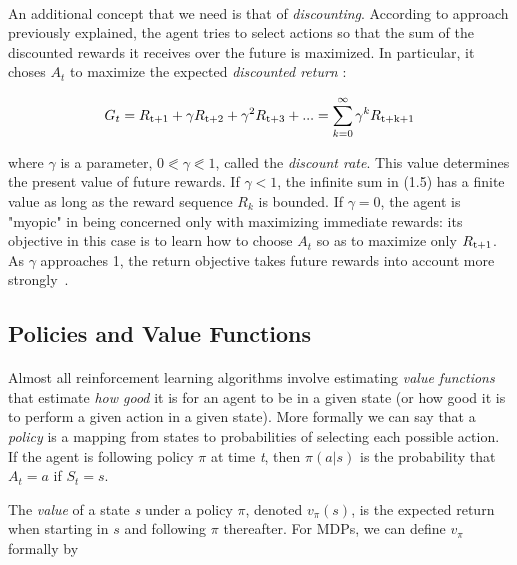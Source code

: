 \paragraph{} An additional concept that we need is that of \textit{discounting}. According to approach previously explained, the agent tries to select actions so that the sum of the discounted rewards it receives over the future is maximized. In particular, it choses $A_t$ to maximize the expected \textit{discounted return} :

\begin{equation} 
  G_t = R\textsubscript{t+1} + \gamma R\textsubscript{t+2} + \gamma^2 R\textsubscript{t+3} + ... = \sum_{k=0}^{\infty} \gamma^kR\textsubscript{t+k+1}
\end{equation}

where $\gamma$ is a parameter, $0 \eqslantless \gamma \eqslantless 1$, called the \textit{discount rate}. This value determines the present value of future rewards.
If $\gamma < 1$, the infinite sum in (1.5) has a finite value as long as the reward sequence ${R_k}$ is bounded.
If $\gamma = 0$, the agent is "myopic" in being concerned only with maximizing immediate rewards: its objective in this case is to learn how to choose $A_t$ so as to maximize only $R\textsubscript{t+1}$.
As $\gamma$ approaches 1, the return objective takes future rewards into account more strongly~\cite{SuttonBarto}.

\subsection{Policies and Value Functions}
\paragraph{} Almost all reinforcement learning algorithms involve estimating \textit{value functions} that estimate \textit{how good} it is for an agent to be in a given state (or how good it is to perform a given action in a given state). 
More formally we can say that a \textit{policy} is a mapping from states to probabilities of selecting each possible action. If the agent is following policy $\pi$ at time \textit{t}, then $\pi(a|s)$ is the probability that $A_t = a$ if $S_t = s$. 

The \textit{value} of a state \textit{s} under a policy $\pi$, denoted $v_\pi(s)$, is the expected return when starting in $s$ and following $\pi$ thereafter. For MDPs, we can define $v_\pi$ formally by

